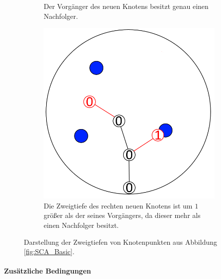 \begin{figure} [hbtp]
\begin{subfigure}[t]{.31\textwidth}
		\caption{Der Vorgänger des neuen Knotens besitzt genau einen Nachfolger.}
		\label{subfig:SCA_Zweigtiefe2}
	\end{subfigure}
	\hspace{.01\textwidth}
	\begin{subfigure}[t]{.31\textwidth}
		\centering
		\includegraphics[width=\linewidth]{images/SCA_Zweigtiefe3.png}
		\caption{Die Zweigtiefe des rechten neuen Knotens ist um $1$ größer als der seines Vorgängers, da dieser mehr als einen Nachfolger besitzt.}
		\label{subfig:SCA_Zweigtiefe3}
	\end{subfigure}
	\caption{Darstellung der Zweigtiefen von Knotenpunkten aus Abbildung \ref{fig:SCA_Basic}. }
	\label{fig:SCA_Zweigtiefe}
\end{figure}

\paragraph{Zusätzliche Bedingungen}

